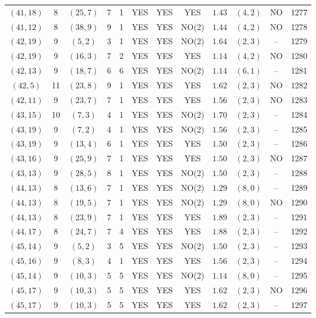 \begin{longtable}{|c|c|c|c|c|c|c|c|c|c|c|c|}
$(41,18)$ & 8 & $(25,7)$ & 7 & 1 & YES & YES & YES & $1.43$ & $(4,2)$ & NO & 1277\\
$(41,12)$ & 8 & $(38,9)$ & 9 & 1 & YES & YES & NO(2) & $1.44$ & $(4,2)$ & NO & 1278\\
$(42,19)$ & 9 & $(5,2)$ & 3 & 1 & YES & YES & NO(2) & $1.64$ & $(2,3)$ & -- & 1279\\
$(42,19)$ & 9 & $(16,3)$ & 7 & 2 & YES & YES & YES & $1.14$ & $(4,2)$ & NO & 1280\\
$(42,13)$ & 9 & $(18,7)$ & 6 & 6 & YES & YES & NO(2) & $1.14$ & $(6,1)$ & -- & 1281\\
$(42,5)$ & 11 & $(23,8)$ & 9 & 1 & YES & YES & YES & $1.62$ & $(2,3)$ & NO & 1282\\
$(42,11)$ & 9 & $(23,7)$ & 7 & 1 & YES & YES & YES & $1.56$ & $(2,3)$ & NO & 1283\\
$(43,15)$ & 10 & $(7,3)$ & 4 & 1 & YES & YES & NO(2) & $1.70$ & $(2,3)$ & -- & 1284\\
$(43,19)$ & 9 & $(7,2)$ & 4 & 1 & YES & YES & NO(2) & $1.56$ & $(2,3)$ & -- & 1285\\
$(43,19)$ & 9 & $(13,4)$ & 6 & 1 & YES & YES & YES & $1.50$ & $(2,3)$ & -- & 1286\\
$(43,16)$ & 9 & $(25,9)$ & 7 & 1 & YES & YES & YES & $1.50$ & $(2,3)$ & NO & 1287\\
$(43,13)$ & 9 & $(28,5)$ & 8 & 1 & YES & YES & NO(2) & $1.50$ & $(2,3)$ & -- & 1288\\
$(44,13)$ & 8 & $(13,6)$ & 7 & 1 & YES & YES & NO(2) & $1.29$ & $(8,0)$ & -- & 1289\\
$(44,13)$ & 8 & $(19,5)$ & 7 & 1 & YES & YES & NO(2) & $1.29$ & $(8,0)$ & NO & 1290\\
$(44,13)$ & 8 & $(23,9)$ & 7 & 1 & YES & YES & YES & $1.89$ & $(2,3)$ & -- & 1291\\
$(44,17)$ & 8 & $(24,7)$ & 7 & 4 & YES & YES & YES & $1.88$ & $(2,3)$ & -- & 1292\\
$(45,14)$ & 9 & $(5,2)$ & 3 & 5 & YES & YES & NO(2) & $1.50$ & $(2,3)$ & -- & 1293\\
$(45,16)$ & 9 & $(8,3)$ & 4 & 1 & YES & YES & YES & $1.56$ & $(2,3)$ & -- & 1294\\
$(45,14)$ & 9 & $(10,3)$ & 5 & 5 & YES & YES & NO(2) & $1.14$ & $(8,0)$ & -- & 1295\\
$(45,17)$ & 9 & $(10,3)$ & 5 & 5 & YES & YES & YES & $1.62$ & $(2,3)$ & NO & 1296\\
$(45,17)$ & 9 & $(10,3)$ & 5 & 5 & YES & YES & YES & $1.62$ & $(2,3)$ & -- & 1297\\

\end{longtable}
